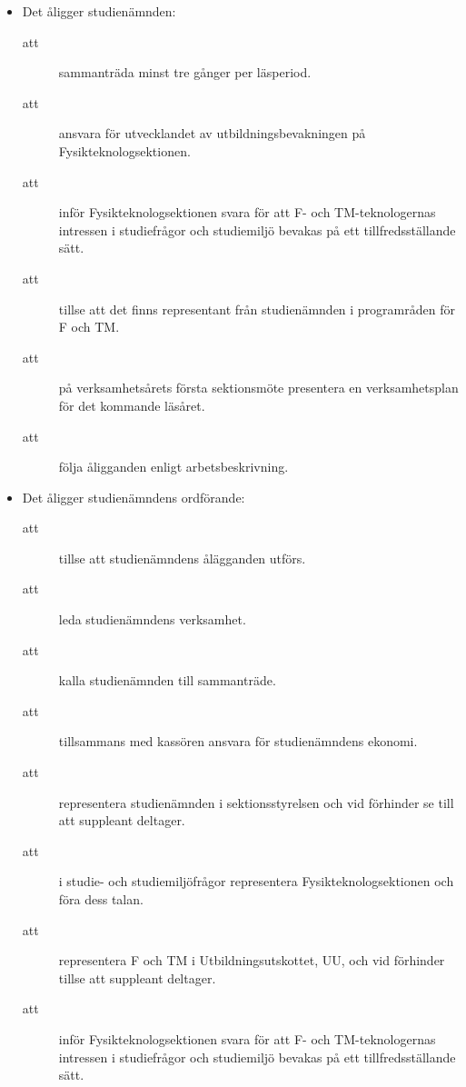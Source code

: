 \documentclass[11pt,a4paper]{article}
\begin{document}
\begin{itemize}%

  \item Det åligger studienämnden:
    \begin{description}
     
      \item[att]  sammanträda minst tre gånger per läsperiod.
    
      \item[att] ansvara för utvecklandet av utbildningsbevakningen på
				Fysiktekno\-log\-sektionen.
      \item[att] inför Fysikteknologsektionen svara för att F- och TM-teknologernas
      intressen i studie\-frågor och studiemiljö bevakas på ett
      tillfredsställande sätt.
      \item[att] tillse att det finns representant från studienämnden i programråden för F och TM.
      \item[att] på verksamhetsårets första sektionsmöte presentera en verksamhetsplan för det kommande läsåret.   
      \item[att] följa åligganden enligt arbetsbeskrivning.
    \end{description}

	\vspace{5mm}

  \item Det åligger studienämndens ordförande:
    \begin{description}
      \item[att] tillse att studienämndens ålägganden utförs.
      \item[att] leda studienämndens verksamhet.
      \item[att] kalla studienämnden till sammanträde.
      \item[att] tillsammans med kassören ansvara för studienämndens ekonomi.
      \item[att] representera studienämnden i sektionsstyrelsen och vid förhinder se till att suppleant deltager.
      \item[att] i studie- och studiemiljöfrågor representera Fysikteknologsektionen och föra dess talan.
      \item[att] representera F och TM i Utbildningsutskottet, UU, och vid förhinder tillse att suppleant deltager.
      \item[att] inför Fysikteknologsektionen svara för att F- och TM-teknologernas
      intressen i studie\-frågor och studiemiljö bevakas på ett
      tillfredsställande sätt.
    \end{description}


\end{itemize}
\end{document}
